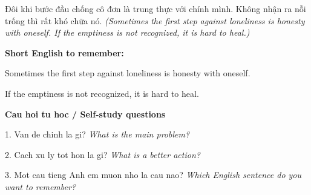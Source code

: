 \begin{baihoc}
Đôi khi bước đầu chống cô đơn là trung thực với chính mình. Không nhận ra nỗi trống thì rất khó chữa nó.
\textit{(Sometimes the first step against loneliness is honesty with oneself. If the emptiness is not recognized, it is hard to heal.)}
\end{baihoc}

\begin{ghinhoanh}
\textbf{Short English to remember:}

Sometimes the first step against loneliness is honesty with oneself.

If the emptiness is not recognized, it is hard to heal.

\end{ghinhoanh}

\begin{tuhocnhanh}
\textbf{Cau hoi tu hoc / Self-study questions}

1. Van de chinh la gi? \textit{What is the main problem?}

2. Cach xu ly tot hon la gi? \textit{What is a better action?}

3. Mot cau tieng Anh em muon nho la cau nao? \textit{Which English sentence do you want to remember?}
\end{tuhocnhanh}
